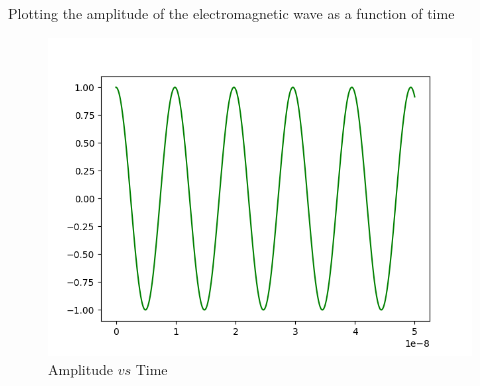 \documentclass[journal,12pt,twocolumn]{IEEEtran}
\theoremstyle{remark}
\begin{document}
Plotting the amplitude of the electromagnetic wave as a function of time
\begin{figure}[h]
    \centering
    \includegraphics[width=\columnwidth]{Figure_1.png}
    \caption{Amplitude $vs$ Time}
    \label{fig:12.8.6.2}
\end{figure}
\end{document}
